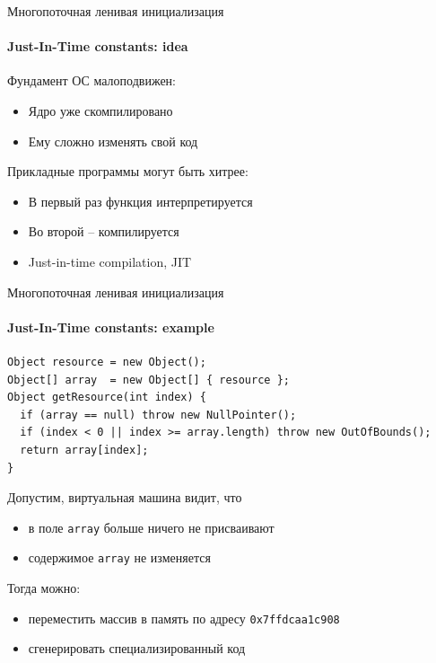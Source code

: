 \begin{frame}{Многопоточная ленивая инициализация}
\framesubtitle{Just-In-Time constants: idea}

Фундамент ОС малоподвижен:
\begin{itemize}
     \item Ядро уже скомпилировано
     
     \pause    
     \item Ему сложно изменять свой код
\end{itemize}

\pause
Прикладные программы могут быть хитрее:
\begin{itemize}
     
     \pause
     \item В первый раз функция интерпретируется
     
     \pause
     \item Во второй -- компилируется
     
     \pause
     \item Just-in-time compilation, JIT
\end{itemize}

\end{frame}


\begin{frame}[t,fragile]{Многопоточная ленивая инициализация}
\framesubtitle{Just-In-Time constants: example}

\begin{verbatim}
Object resource = new Object();
Object[] array  = new Object[] { resource };
Object getResource(int index) {
  if (array == null) throw new NullPointer();
  if (index < 0 || index >= array.length) throw new OutOfBounds();
  return array[index];
}
\end{verbatim}

\pause 

Допустим, виртуальная машина видит, что
\begin{itemize}
    \item в поле \texttt{array} больше ничего не присваивают 
    \item содержимое \texttt{array} не изменяется
\end{itemize}

\pause 

Тогда можно:
\begin{itemize}
    \item переместить массив в память по адресу \texttt{0x7ffdcaa1c908}
    \item сгенерировать специализированный код
\end{itemize}

\end{frame}


